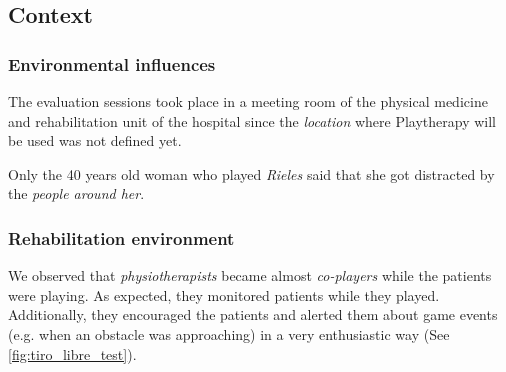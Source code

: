 \begin{table}[bth]
\caption{Demographic information of 8 participants of the \ac{PX} evaluation sessions}
\myfloatalign
{}
\label{tab:participnats_demographic}
\end{table}

\subsection{Context}

\subsubsection{Environmental influences}
The evaluation sessions took place in a meeting room of the physical medicine and rehabilitation unit of the hospital since the \textit{location} where Playtherapy will be used was not defined yet.

Only the 40 years old woman who played \textit{Rieles} said that she got distracted by the \textit{people around her}.

\subsubsection{Rehabilitation environment}
We observed that \textit{physiotherapists} became almost \textit{co-players} while the patients were playing. As expected, they monitored patients while they played. Additionally, they encouraged the patients and alerted them about game events (e.g. when an obstacle was approaching) in a very enthusiastic way (See \autoref{fig:tiro_libre_test}).

